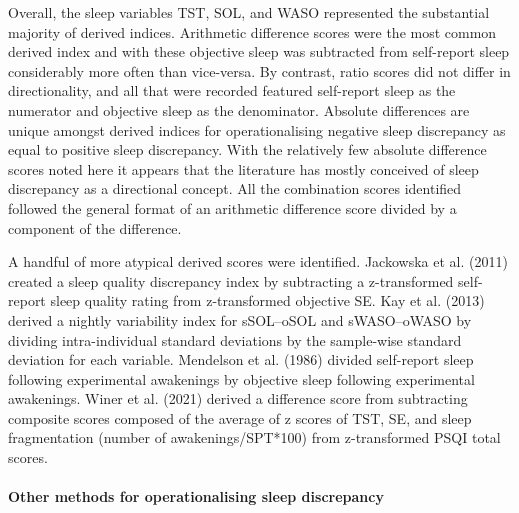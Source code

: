 \documentclass[
]{article}
\begin{document}
Overall, the sleep variables TST, SOL, and WASO represented the substantial majority of derived indices. Arithmetic difference scores were the most common derived index and with these objective sleep was subtracted from self-report sleep considerably more often than vice-versa. By contrast, ratio scores did not differ in directionality, and all that were recorded featured self-report sleep as the numerator and objective sleep as the denominator. Absolute differences are unique amongst derived indices for operationalising negative sleep discrepancy as equal to positive sleep discrepancy. With the relatively few absolute difference scores noted here it appears that the literature has mostly conceived of sleep discrepancy as a directional concept. All the combination scores identified followed the general format of an arithmetic difference score divided by a component of the difference.

A handful of more atypical derived scores were identified. Jackowska et al. (2011) created a sleep quality discrepancy index by subtracting a z-transformed self-report sleep quality rating from z-transformed objective SE. Kay et al. (2013) derived a nightly variability index for sSOL--oSOL and sWASO--oWASO by dividing intra-individual standard deviations by the sample-wise standard deviation for each variable. Mendelson et al. (1986) divided self-report sleep following experimental awakenings by objective sleep following experimental awakenings. Winer et al. (2021) derived a difference score from subtracting composite scores composed of the average of z scores of TST, SE, and sleep fragmentation (number of awakenings/SPT*100) from z-transformed PSQI total scores.

\paragraph{Other methods for operationalising sleep discrepancy}\label{altdisc}
\end{document}
